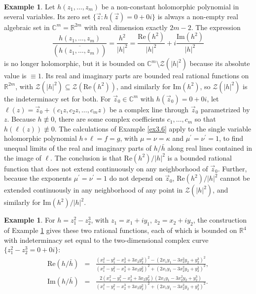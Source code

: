 \documentclass[12pt]{amsart}
\theoremstyle{definition}
\newtheorem{example}[thm]{Example}
\theoremstyle{remark}
\numberwithin{equation}{section}
\newcommand{\re}{\mathbb{R}}
\newcommand{\co}{\mathbb{C}}
\newcommand{\vv}{\mathcal{Z}}
\newcommand{\rp}{\mbox{Re}}
\newcommand{\ip}{\mbox{Im}}
\begin{document}
\begin{example}\label{ex4.2}
  Let $h(z_1,\ldots,z_m)$ be a non-constant holomorphic polynomial in several variables.  Its zero set $\{\vec z:h(\vec z)=0+0i\}$ is always a non-empty real algebraic set in $\co^m=\re^{2m}$ with real dimension exactly $2m-2$.  The expression 
  \begin{equation}\label{eq4.10}
  \frac{h(z_1,\ldots,z_m)}{\left(\overline{h(z_1,\ldots,z_m)}\right)}=\frac{h^2}{|h|^2}=\frac{\rp(h^2)}{|h|^2}+i\frac{\ip(h^2)}{|h|^2}
  \end{equation}
  is no longer holomorphic, but it is bounded on $\co^m\setminus\vv(|h|^2)$ because its absolute value is $\equiv1$.  Its real and imaginary parts are bounded real rational functions on $\re^{2m}$, with $\vv(|h|^2)\subseteq\vv(\rp(h^2))$, and similarly for $\ip(h^2)$, so $\vv(|h|^2)$ is the indeterminacy set for both.  For $\vec z_0\in\co^m$ with $h(\vec z_0)=0+0i$, let $\ell(z)=\vec z_0+(c_1z,c_2z,\ldots,c_mz)$ be a complex line through $\vec z_0$ parametrized by $z$.  Because $h\not\equiv0$, there are some complex coefficients $c_1,\ldots,c_m$ so that $h(\ell(z))\not\equiv0$.  The calculations of Example \ref{ex3.6} apply to the single variable holomorphic polynomial $h\circ\ell=f=g$, with $\mu=\nu=\kappa$ and $\mu^\prime=\nu^\prime=1$, to find unequal limits of the real and imaginary parts of $h/\bar h$ along real lines contained in the image of $\ell$.  The conclusion is that $\rp(h^2)/|h|^2$ is a bounded rational function that does not extend continuously on any neighborhood of $\vec z_0$.  Further, because the exponents $\mu^\prime=\nu^\prime=1$ do not depend on $\vec z_0$, $\rp(h^2)/|h|^2$ cannot be extended continuously in any neighborhood of any point in $\vv(|h|^2)$, and similarly for $\ip(h^2)/|h|^2$.
\end{example}


\begin{example}\label{ex4.3}
For $h = z_1^2 - z_2^3$, with  $z_1 = x_1 + i y_1$, $z_2 = x_2 + i y_2$, the construction of Example \ref{ex4.2} gives these two rational functions, each of which is bounded on $\re^4$ with indeterminacy set equal to the two-dimensional complex curve $\{z_1^2-z_2^3=0+0i\}$:
\begin{eqnarray*}
 \rp(h/\bar h)&=&\frac{(x_1^2 - y_1^2 - x_2^3 + 3x_2 y_2^2)^2 - (2x_1 y_1 - 3x_2^2 y_2 + y_2^3)^2}{(x_1^2 - y_1^2 - x_2^3 + 3x_2 y_2^2)^2 + (2x_1 y_1 - 3x_2^2 y_2 + y_2^3)^2},\\
  \ip(h/\bar h)&=&\frac{2(x_1^2 - y_1^2 - x_2^3 + 3x_2 y_2^2)(2x_1 y_1 - 3x_2^2 y_2 + y_2^3)}{(x_1^2 - y_1^2 - x_2^3 + 3x_2 y_2^2)^2 + (2x_1 y_1 - 3x_2^2 y_2 + y_2^3)^2}.
\end{eqnarray*}
\end{example}
 
\end{document}
